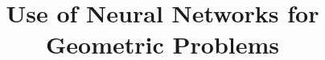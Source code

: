\documentclass[xcolor=dvipsnames,compress,t,pdf,9pt]{beamer}
\title{Use of Neural Networks for Geometric Problems}
\begin{document}
	\begin{frame}
	\titlepage
	\end{frame}
	
	

	
\end{document}
